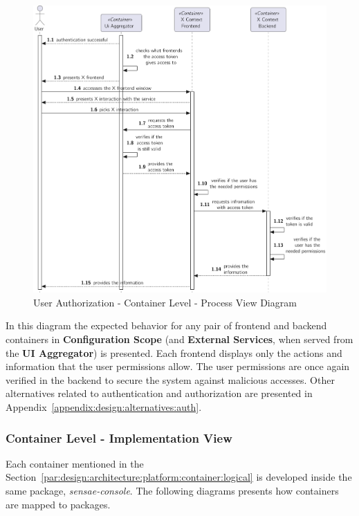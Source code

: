 \begin{figure}[H]
   \centering
   \includegraphics[page=1,width=0.8\columnwidth]{assets/diagrams/design/architectural/level2/process/user-authorization.pdf}
   \caption[User Authorization - Container Level - Process View Diagram]{User Authorization - Container Level - Process View Diagram}
   \label{fig:design:architecture:platform:container:process:diagram:authorization}
\end{figure}

In this diagram the expected behavior for any pair of frontend and backend containers in \textbf{Configuration Scope} (and \textbf{External Services}, when served from the \textbf{UI Aggregator}) is presented. Each frontend displays only the actions and information that the user permissions allow. The user permissions are once again verified in the backend to secure the system against malicious accesses. Other alternatives related to authentication and authorization are presented in  Appendix~\ref{appendix:design:alternatives:auth}.

\subsubsection{Container Level - Implementation View}
\label{par:design:architecture:platform:container:development}

Each container mentioned in the Section~\ref{par:design:architecture:platform:container:logical} is developed inside the same package, \textit{sensae-console}. The following diagrams presents how containers are mapped to packages.

